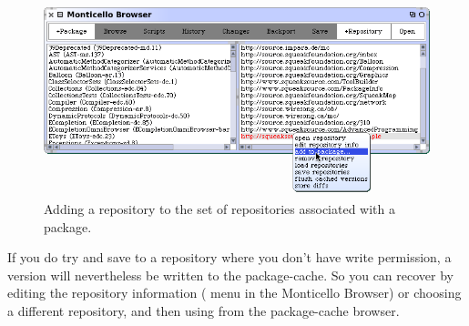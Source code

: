 \documentclass[a4paper,10pt,twoside]{book}
\begin{document}
\begin{figure}[tbp]
	\begin{center}
		\includegraphics[width=\textwidth]{MCaddToPackage}
	\end{center}
	\caption{Adding a repository to the set of repositories associated with a package.}
	\label{fig:associateRepository}
\end{figure}

If you do try and save to a repository where you don't have write permission, a version will nevertheless be written to the package-cache.  
So you can recover by editing the repository information ( menu in the Monticello Browser) or choosing a different repository, and then using  from the package-cache browser.
\end{document}
